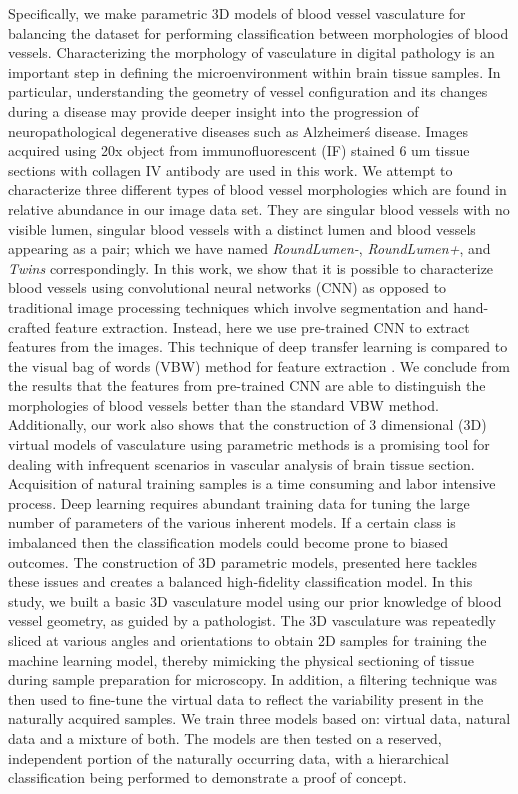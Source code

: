 Specifically, we make parametric 3D models of blood vessel vasculature for balancing the dataset for performing classification between morphologies of blood vessels.
Characterizing the morphology of vasculature in digital pathology is an important step in defining the microenvironment within brain tissue samples. In particular, understanding the geometry of vessel configuration and its changes during a disease may provide deeper insight into the progression of neuropathological degenerative diseases such as Alzheimer\'s disease. Images acquired using 20x object from immunofluorescent (IF) stained 6 um tissue sections with collagen IV antibody are used in this work.  We attempt to characterize three different types of blood vessel morphologies which are found in relative abundance in our image data set. They are singular blood vessels with no visible lumen, singular blood vessels with a distinct lumen and blood vessels appearing as a pair; which we have named \textit{RoundLumen-}, \textit{RoundLumen+}, and \textit{Twins} correspondingly.
In this work, we show that it is possible to characterize blood vessels using convolutional neural networks (CNN) as opposed to traditional image processing techniques which involve segmentation and hand-crafted feature extraction. Instead, here we use pre-trained CNN to extract features from the images. This technique of deep transfer learning is compared to the visual bag of words (VBW) method for feature extraction \cite{yang2007evaluating}. We conclude from the results that the features from pre-trained CNN are able to distinguish the morphologies of blood vessels better than the standard VBW method. 
Additionally, our work also shows that the construction of 3 dimensional (3D) virtual models of vasculature using parametric methods is a promising tool for dealing with infrequent scenarios in vascular analysis of brain tissue section. Acquisition of natural training samples is a time consuming and labor intensive process. Deep learning requires abundant training data for tuning the large number of parameters of the various inherent models. If a certain class is imbalanced then the classification models could become prone to biased outcomes. The construction of 3D parametric models, presented here tackles these issues and creates a balanced high-fidelity classification model. 
In this study, we built a basic 3D vasculature model using our prior knowledge of blood vessel geometry, as guided by a pathologist. The 3D vasculature was repeatedly sliced at various angles and orientations to obtain 2D samples for training the machine learning model, thereby mimicking the physical sectioning of tissue during sample preparation for microscopy. In addition, a filtering technique was then used to fine-tune the virtual data to reflect the variability present in the naturally acquired samples. We train three models based on: virtual data, natural data and a mixture of both. The models are then tested on a reserved, independent portion of the naturally occurring data, with a hierarchical classification being performed to demonstrate a proof of concept. 
